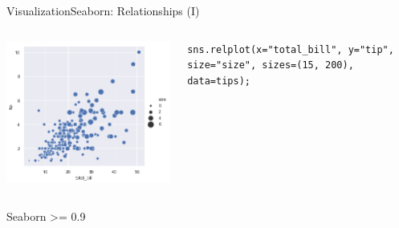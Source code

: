 \documentclass[10pt,compress]{beamer} %
\begin{document}
\begin{frame}[fragile]{Visualization}{Seaborn: Relationships (I)}
\begin{columns}[t]
	\includegraphics[width=\textwidth]{figs/sns-scatterplot3.png}\\
	\begin{exampleblock}{}
	\vspace{-0.2cm} 
	\begin{lstlisting}[basicstyle=\tiny]
	sns.relplot(x="total_bill", y="tip", size="size", sizes=(15, 200), data=tips);
	\end{lstlisting}
	\vspace{-0.2cm} 
	\end{exampleblock}

	\end{columns}

	Seaborn >= 0.9
\end{frame}
\end{document}
